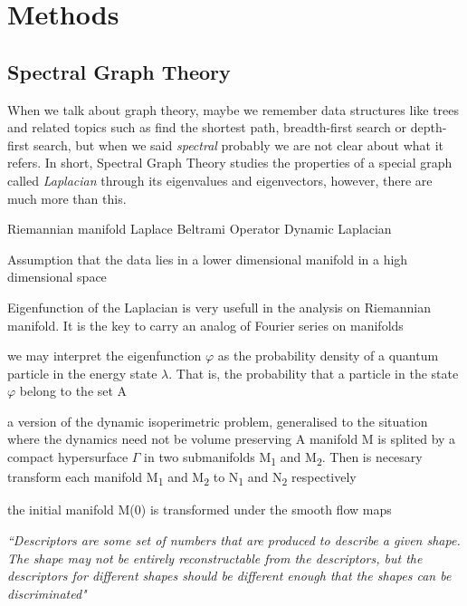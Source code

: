 \part{Methods}
\chapter{Spectral Graph Theory}

When we talk about graph theory, maybe we remember  data structures like trees and related topics such as find the shortest path, breadth-first search or depth-first search, but when we said \emph{spectral} probably we are not clear about what it refers. In short, Spectral Graph Theory studies the properties of a special graph called \emph{Laplacian} through its eigenvalues and eigenvectors, however, there are much more than this.

Riemannian manifold
Laplace Beltrami Operator
Dynamic Laplacian

Assumption that the data lies in a lower dimensional manifold in a high dimensional space

Eigenfunction of the Laplacian is very usefull in the analysis on Riemannian manifold. It is the key to carry an analog of Fourier series on manifolds 

we may interpret the eigenfunction $\varphi$ as the probability density of a quantum particle in the energy state $\lambda$. That is, the probability that a particle in the state $\varphi$ belong to the set A

a version of the dynamic isoperimetric problem, generalised to the situation where the dynamics need not be volume preserving
A manifold M is splited by a compact hypersurface $\Gamma$ in two submanifolds M\textsubscript{1} and M\textsubscript{2}. Then is necesary transform each manifold M\textsubscript{1} and M\textsubscript{2} to N\textsubscript{1} and N\textsubscript{2}  respectively

the initial manifold M(0) is transformed under the smooth flow maps 




\textit{
	``Descriptors are some set of numbers that are produced to describe a given shape. The shape may not be entirely reconstructable from the descriptors, but the descriptors for different shapes should be different enough that the shapes can be discriminated"
}
